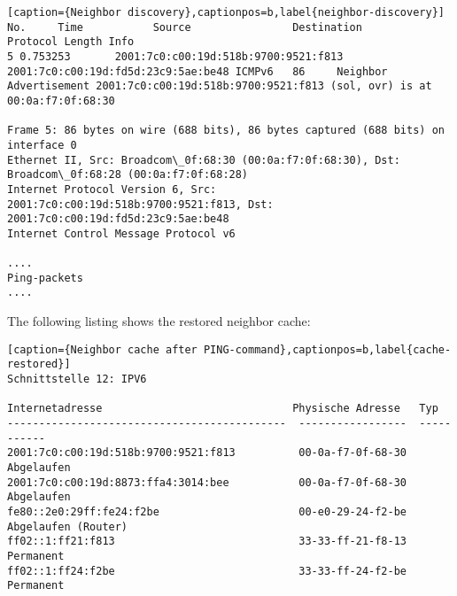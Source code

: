 \begin{lstlisting}[caption={Neighbor discovery},captionpos=b,label{neighbor-discovery}]
No.     Time           Source                Destination           Protocol Length Info
5 0.753253       2001:7c0:c00:19d:518b:9700:9521:f813 2001:7c0:c00:19d:fd5d:23c9:5ae:be48 ICMPv6   86     Neighbor Advertisement 2001:7c0:c00:19d:518b:9700:9521:f813 (sol, ovr) is at 00:0a:f7:0f:68:30

Frame 5: 86 bytes on wire (688 bits), 86 bytes captured (688 bits) on interface 0
Ethernet II, Src: Broadcom\_0f:68:30 (00:0a:f7:0f:68:30), Dst: Broadcom\_0f:68:28 (00:0a:f7:0f:68:28)
Internet Protocol Version 6, Src: 2001:7c0:c00:19d:518b:9700:9521:f813, Dst: 2001:7c0:c00:19d:fd5d:23c9:5ae:be48
Internet Control Message Protocol v6

....
Ping-packets
....
\end{lstlisting}

 The following listing shows the restored neighbor cache:\\
\begin{lstlisting}[caption={Neighbor cache after PING-command},captionpos=b,label{cache-restored}]
Schnittstelle 12: IPV6

Internetadresse                              Physische Adresse   Typ
--------------------------------------------  -----------------  -----------
2001:7c0:c00:19d:518b:9700:9521:f813          00-0a-f7-0f-68-30  Abgelaufen
2001:7c0:c00:19d:8873:ffa4:3014:bee           00-0a-f7-0f-68-30  Abgelaufen
fe80::2e0:29ff:fe24:f2be                      00-e0-29-24-f2-be  Abgelaufen (Router)
ff02::1:ff21:f813                             33-33-ff-21-f8-13  Permanent
ff02::1:ff24:f2be                             33-33-ff-24-f2-be  Permanent
\end{lstlisting}

